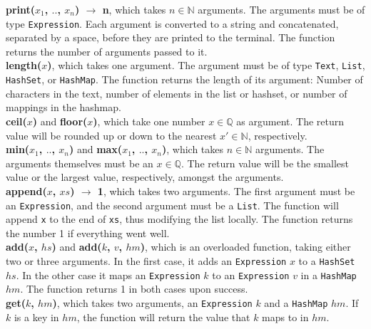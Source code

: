 \textbf{print($x_{1}$, $..$, $x_{n}$) $\xrightarrow{}$ n}, which takes $n \in \mathbb{N}$ arguments. The arguments must be of type \texttt{Expression}. Each argument is converted to a string and concatenated, separated by a space, before they are printed to the terminal. The function returns the number of arguments passed to it. \hfill \\

\textbf{length($x$)}, which takes one argument. The argument must be of type \texttt{Text}, \texttt{List}, \texttt{HashSet}, or \texttt{HashMap}. The function returns the length of its argument: Number of characters in the text, number of elements in the list or hashset, or number of mappings in the hashmap. \hfill \\

\textbf{ceil($x$)} and \textbf{floor($x$)}, which take one number $x \in \mathbb{Q}$ as argument. The return value will be rounded up or down to the nearest $x' \in \mathbb{N}$, respectively. \hfill \\

\textbf{min($x_{1}$, $..$, $x_{n}$)} and \textbf{max($x_{1}$, $..$, $x_{n}$)}, which takes $n \in \mathbb{N}$ arguments. The arguments themselves must be an $x \in \mathbb{Q}$. The return value will be the smallest value or the largest value, respectively, amongst the arguments. \hfill \\

\textbf{append($x$, $xs$) $\xrightarrow{}$ 1}, which takes two arguments. The first argument must be an \texttt{Expression}, and the second argument must be a \texttt{List}. The function will append \texttt{x} to the end of \texttt{xs}, thus modifying the list locally. The function returns the number 1 if everything went well. \hfill \\

\textbf{add($x$, $hs$)} and \textbf{add($k$, $v$, $hm$)}, which is an overloaded function, taking either two or three arguments. In the first case, it adds an \texttt{Expression} $x$ to a \texttt{HashSet} $hs$. In the other case it maps an \texttt{Expression} $k$ to an \texttt{Expression} $v$ in a \texttt{HashMap} $hm$. The function returns 1 in both cases upon success. \hfill \\

\textbf{get($k$, $hm$)}, which takes two arguments, an \texttt{Expression} $k$ and a \texttt{HashMap} $hm$. If $k$ is a key in $hm$, the function will return the value that $k$ maps to in $hm$. \hfill \\

